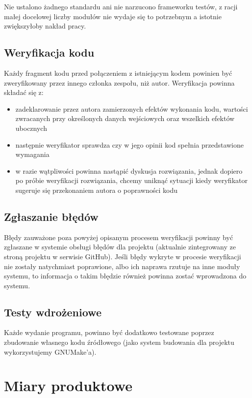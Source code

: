 \documentclass[a4paper]{article}
\begin{document}
Nie ustalono żadnego standardu ani nie narzucono frameworku testów, z racji małej docelowej liczby modułów nie wydaje się to potrzebnym a istotnie zwiększyłoby nakład pracy.

\subsection{Weryfikacja kodu}

Każdy fragment kodu przed połączeniem z istniejącym kodem powinien być zweryfikowany przez innego członka zespołu, niż autor. Weryfikacja powinna składać się z:
\begin{itemize}
\item zadeklarowanie przez autora zamierzonych efektów wykonania kodu, wartości zwracanych przy określonych danych wejściowych oraz wszelkich efektów ubocznych
\item następnie weryfikator sprawdza czy w jego opinii kod spełnia przedstawione wymagania
\item w razie wątpliwości powinna nastąpić dyskusja rozwiązania, jednak dopiero po próbie weryfikacji rozwiązania, chcemy uniknąć sytuacji kiedy weryfikator sugeruje się przekonaniem autora o poprawności kodu
\end{itemize}

\subsection{Zgłaszanie błędów}

Błędy zauważone poza powyżej opisanym procesem weryfikacji powinny być zgłaszane w systemie obsługi błędów dla projektu (aktualnie zintegrowany ze stroną projektu w serwisie GitHub). Jeśli błędy wykryte w procesie weryfikacji nie zostały natychmiast poprawione, albo ich naprawa rzutuje na inne moduły systemu, to informacja o takim błędzie również powinna zostać wprowadzona do systemu.

\subsection{Testy wdrożeniowe}

Każde wydanie programu, powinno być dodatkowo testowane poprzez zbudowanie własnego kodu źródłowego (jako system budowania dla projektu wykorzystujemy GNUMake’a).

\section{Miary produktowe}
\end{document}
